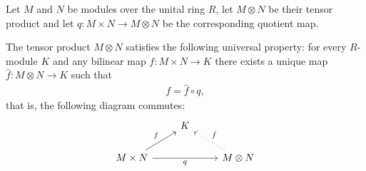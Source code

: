 \begin{theorem}\label{thm:tensor_product_universal_property}\cite[theorem 10.18]{Knapp2016BAlg}
  Let $M$ and $N$ be modules over the unital ring $R$, let $M \otimes N$ be their tensor product and let $q: M \times N \to M \otimes N$ be the corresponding quotient map.

  The tensor product $M \otimes N$ satisfies the following universal property: for every $R$-module $K$ and any bilinear map $f: M \times N \to K$ there exists a unique map $\hat f: M \otimes N \to K$ such that
  \begin{align*}
    f = \hat f \circ q,
  \end{align*}
  that is, the following diagram commutes:
  \begin{equation}\label{thm:tensor_product_universal_property}
    \begin{tikzcd}[baseline=(current bounding box.center)]
                                                  & K & \\
      M \times N \arrow[ru, "f"] \arrow[rr, "q"'] &   & M \otimes N \arrow[lu, "\hat f"', dotted]
    \end{tikzcd}
  \end{equation}
\end{theorem}
